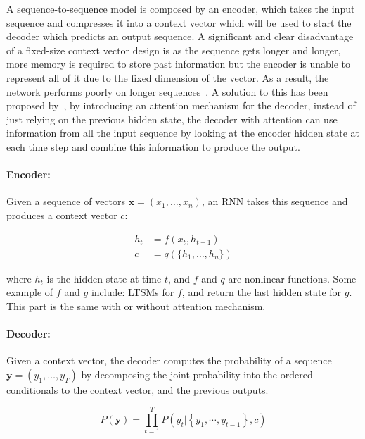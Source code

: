 A sequence-to-sequence model is composed by an encoder, which takes the input sequence and compresses it into a context vector which will be used to start the decoder which predicts an output sequence.  A significant and clear disadvantage of a fixed-size context vector design is as the sequence gets longer and longer, more memory is required to store past information but the encoder is unable to represent all of it due to the fixed dimension of the vector. As a result, the network performs poorly on longer sequences~\citep{cho-etal-2014-properties}. A solution to this has been proposed by~\cite{bahdanau2014neural}, by introducing an attention mechanism for the decoder, instead of just relying on the previous hidden state, the decoder with attention can use information from all the input sequence by looking at the encoder hidden state at each time step and combine this information to produce the output.

\paragraph{Encoder:} Given a sequence of vectors $\textbf{x} = (x_1, \dots, x_n)$, an RNN takes this sequence and produces a context vector $c$:

\begin{equation}
    \begin{split}
        h_t & = f(x_t, h_{t-1})\\
        c & = q(\{h_1, \dots, h_n\}) 
    \end{split}
\end{equation}

where $h_t$ is the hidden state at time $t$, and $f$ and $q$ are nonlinear functions. Some example of $f$ and $g$ include: LTSMs for $f$, and return the last hidden state for $g$. This part is the same with or without attention mechanism.



\paragraph{Decoder:} Given a context vector, the decoder computes the probability of a sequence $\textbf{y} = (y_1, \dots, y_T)$ by decomposing the joint probability into the ordered conditionals to the context vector, and the previous outputs.

\begin{equation}
P(\mathbf{y})=\prod_{t=1}^{T} P\left(y_{t} |\left\{y_{1}, \cdots, y_{t-1}\right\}, c\right)
\end{equation}

